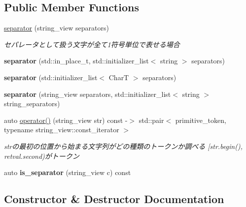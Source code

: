 \subsection*{Public Member Functions}
\begin{DoxyCompactItemize}
\item 
\mbox{\hyperlink{classouchi_1_1tokenizer_1_1separator_abb47a7dae29f5bc4286054940fe3dd1f}{separator}} (string\+\_\+view separators)
\begin{DoxyCompactList}\small\item\em セパレータとして扱う文字が全て1符号単位で表せる場合 \end{DoxyCompactList}\item 
\mbox{\label{classouchi_1_1tokenizer_1_1separator_a8d4f141ac89b156bdef3b87086021f0e}} 
{\bfseries separator} (std\+::in\+\_\+place\+\_\+t, std\+::initializer\+\_\+list$<$ string $>$ separators)
\item 
\mbox{\label{classouchi_1_1tokenizer_1_1separator_a1b1d9328105643bc95142fe0a4f51d2c}} 
{\bfseries separator} (std\+::initializer\+\_\+list$<$ CharT $>$ separators)
\item 
\mbox{\label{classouchi_1_1tokenizer_1_1separator_a8f14b9e0f364379005b9d4e7b6f45197}} 
{\bfseries separator} (string\+\_\+view separators, std\+::initializer\+\_\+list$<$ string $>$ string\+\_\+separators)
\item 
auto \mbox{\hyperlink{classouchi_1_1tokenizer_1_1separator_ad62842349250e62ba12fcca9f0898d00}{operator()}} (string\+\_\+view str) const -\/$>$ std\+::pair$<$ primitive\+\_\+token, typename string\+\_\+view\+::const\+\_\+iterator $>$
\begin{DoxyCompactList}\small\item\em strの最初の位置から始まる文字列がどの種類のトークンか調べる \mbox{[}str.\+begin(), retval.\+second)がトークン \end{DoxyCompactList}\item 
\mbox{\label{classouchi_1_1tokenizer_1_1separator_a683e4c5787d1d94124699b12285a9ec7}} 
auto {\bfseries is\+\_\+separator} (string\+\_\+view c) const
\end{DoxyCompactItemize}


\subsection{Constructor \& Destructor Documentation}
\mbox{\label{classouchi_1_1tokenizer_1_1separator_abb47a7dae29f5bc4286054940fe3dd1f}} 
